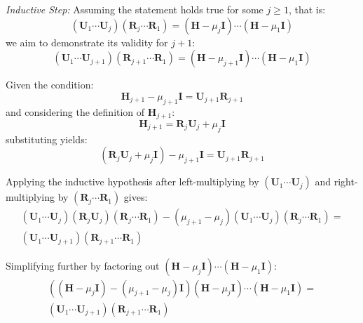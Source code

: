 \documentclass{article}
\begin{document}
\textit{Inductive Step:} Assuming the statement holds true for some $j \geq 1$, that is:
\begin{equation}
\left(\boldsymbol{U}_1 \cdots \boldsymbol{U}_j\right)\left(\boldsymbol{R}_j \cdots \boldsymbol{R}_1\right) = \left(\boldsymbol{H} - \mu_j \mathbf{I}\right) \cdots \left(\boldsymbol{H} - \mu_1 \mathbf{I}\right)
\end{equation}
we aim to demonstrate its validity for $j+1$:
\begin{equation}
\left(\boldsymbol{U}_1 \cdots \boldsymbol{U}_{j+1}\right)\left(\boldsymbol{R}_{j+1} \cdots \boldsymbol{R}_1\right) = \left(\boldsymbol{H} - \mu_{j+1} \mathbf{I}\right) \cdots \left(\boldsymbol{H} - \mu_1 \mathbf{I}\right)
\end{equation}

Given the condition:
\begin{equation}
\boldsymbol{H}_{j+1} - \mu_{j+1} \mathbf{I} = \boldsymbol{U}_{j+1} \boldsymbol{R}_{j+1}
\end{equation}
and considering the definition of $\boldsymbol{H}_{j+1}$:
\begin{equation}
\boldsymbol{H}_{j+1} = \boldsymbol{R}_j \boldsymbol{U}_j + \mu_j \mathbf{I}
\end{equation}
substituting yields:
\begin{equation}
\left(\boldsymbol{R}_j \boldsymbol{U}_j + \mu_j \mathbf{I}\right) - \mu_{j+1} \mathbf{I} = \boldsymbol{U}_{j+1} \boldsymbol{R}_{j+1}
\end{equation}

Applying the inductive hypothesis after left-multiplying by $\left(\boldsymbol{U}_1 \cdots \boldsymbol{U}_j\right)$ and right-multiplying by $\left(\boldsymbol{R}_j \cdots \boldsymbol{R}_1\right)$ gives:
\begin{equation}
\begin{gathered}
\left(\boldsymbol{U}_1 \cdots \boldsymbol{U}_j\right)\left(\boldsymbol{R}_j \boldsymbol{U}_j\right)\left(\boldsymbol{R}_j \cdots \boldsymbol{R}_1\right) - \left(\mu_{j+1} - \mu_j\right)\left(\boldsymbol{U}_1 \cdots \boldsymbol{U}_j\right)\left(\boldsymbol{R}_j \cdots \boldsymbol{R}_1\right) = \\
\left(\boldsymbol{U}_1 \cdots \boldsymbol{U}_{j+1}\right)\left(\boldsymbol{R}_{j+1} \cdots \boldsymbol{R}_1\right)
\end{gathered}
\end{equation}

Simplifying further by factoring out $\left(\boldsymbol{H} - \mu_j \mathbf{I}\right) \cdots \left(\boldsymbol{H} - \mu_1 \mathbf{I}\right)$:
\begin{equation}
\begin{gathered}
\left(\left(\boldsymbol{H} - \mu_j \mathbf{I}\right) - \left(\mu_{j+1} - \mu_j\right) \mathbf{I}\right)\left(\boldsymbol{H} - \mu_j \mathbf{I}\right) \cdots \left(\boldsymbol{H} - \mu_1 \mathbf{I}\right) = \\
\left(\boldsymbol{U}_1 \cdots \boldsymbol{U}_{j+1}\right)\left(\boldsymbol{R}_{j+1} \cdots \boldsymbol{R}_1\right)
\end{gathered}
\end{equation}
\end{document}
